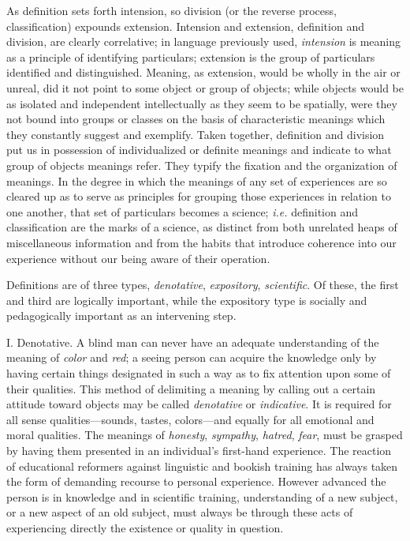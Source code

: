 \documentclass[showtrims,ustradepaper]{memoir}
\begin{document}
As definition sets forth intension, so division (or the reverse process,
classification) expounds extension. Intension and extension, definition
and division, are clearly correlative; in language previously used,
\emph{intension} is meaning as a principle of identifying particulars;
extension is the group of particulars identified and distinguished.
Meaning, as extension, would be wholly in the air or unreal, did it not
point to some object or group of objects; while objects would be as
isolated and independent intellectually as they seem to be spatially,
were they not bound into groups or classes on the basis of
characteristic meanings which they constantly suggest and exemplify.
Taken together, definition and division put us in possession of
individualized or definite meanings and indicate to what group of
objects meanings refer. They typify the fixation and the organization of
meanings. In the degree in which the meanings of any set of experiences
are so cleared up as to serve as principles for grouping those
experiences in relation to one another, that set of particulars becomes
a science; \emph{i.e.} definition and classification are the marks of a
science, as distinct from both unrelated heaps of miscellaneous
information and from the habits that introduce coherence into our
experience without our being aware of their operation.

Definitions are of three types, \emph{denotative}, \emph{expository},
\emph{scientific}. Of these, the first and third are logically
important, while the expository type is socially and pedagogically
important as an intervening step.


I. Denotative. A blind man can never have an adequate understanding of
the meaning of \emph{color} and \emph{red}; a seeing person can acquire
the knowledge only by
having
certain things designated in such a way as to fix attention upon some of
their qualities. This method of delimiting a meaning by calling out a
certain attitude toward objects may be called \emph{denotative} or
\emph{indicative}. It is required for all sense qualities---sounds,
tastes, colors---and equally for all emotional and moral qualities. The
meanings of \emph{honesty}, \emph{sympathy}, \emph{hatred}, \emph{fear},
must be grasped by having them presented in an individual's first-hand
experience. The reaction of educational reformers against linguistic and
bookish training has always taken the form of demanding recourse to
personal experience. However advanced the person is in knowledge and in
scientific training, understanding of a new subject, or a new aspect of
an old subject, must always be through these acts of experiencing
directly the existence or quality in question.
\end{document}
